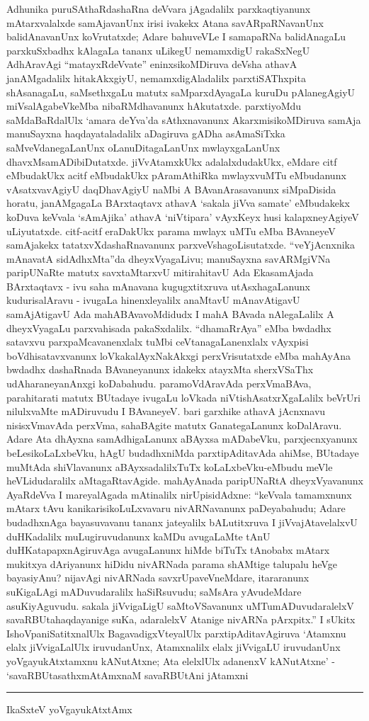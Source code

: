 Adhunika puruSAthaRdashaRna deVvara jAgadalilx parxkaqtiyanunx mAtarxvalalxde samAja\-vanUnx irisi ivakekx Atana savARpaRNavanUnx balidAnavanUnx koVrutatxde; Adare bahuveVLe I samapaRNa balidAnagaLu parxkuSxbadhx kAlagaLa tananx uLikegU nemamxdigU rakaSxNegU AdhAravAgi ``matayxRdeVvate'' eninxsikoMDiruva deVsha athavA janAMgadalilx hita\-kAkxgiyU, nemamxdigAladalilx parxtiSAThxpita shAsanagaLu, saMsethxgaLu matutx saMparxdAya\-gaLa kuruDu pAlanegAgiyU miVsalAgabeVkeMba nibaRMdhavanunx hAkutatxde. parxtiyoMdu saMdaBaRdalUlx `amara deYva'da sAthxnavanunx AkarxmisikoMDiruva samAja manuSayxna haqdayataladalilx aDagiruva gADha asAmaSiTxka saMveVdanegaLanUnx oLanuDitagaLanUnx mwlayxgaLanUnx dhavxMsamADibiDutatxde. jiVvAtamxkUkx adalalxdudakUkx, eMdare citf eMbu\-dakUkx acitf eMbudakUkx pAramAthiRka mwlayxvuMTu eMbudanunx vAsatxvavAgiyU daqDhavAgiyU naMbi A BAvanArasavanunx siMpaDisida horatu, janAMgagaLa BArxtaqtavx athavA `sakala jiVva samate' eMbudakekx koDuva keVvala `sAmAjika' athavA `niVtipara' vAyxKeyx husi kalapxneyAgiyeV uLiyutatxde. citf-acitf eraDakUkx parama mwlayx uMTu eMba BAvaneyeV samAjakekx tatatxvXdashaRnavanunx parxveVshagoLisutatxde. ``veYjAcnx\-nika mAnavatA sidAdhxMta''da dheyxVyagaLivu; manuSayxna savARMgiVNa paripUNaRte matutx savxtaMtarxvU mitirahitavU Ada EkasamAjada BArxtaqtavx - ivu saha mAnavana kugugx\-titxruva utAsxhagaLanunx kudurisalAravu - ivugaLa hinenxleyalilx anaMtavU mAna\-vAtigavU samAjAtigavU Ada mahABAvavoMdidudx I mahA BAvada nAlegaLalilx A dheyxVya\-gaLu parxvahisada pakaSxdalilx. ``dhamaRrAya'' eMba bwdadhx satavxvu parxpaMcavanenxlalx tuMbi ceVtanagaLanenxlalx vAyxpisi boVdhisatavxvanunx loVkakalAyxNakAkxgi perxVrisutatxde eMba mahA\-yAna bwdadhx dashaRnada BAvaneyanunx idakekx atayxMta sherxVSaThx udAharaneyanAnxgi koDa\-bahudu. paramoVdAravAda perxVmaBAva, parahitarati matutx BUtadaye ivu\-gaLu loVkada niVtishAsatxrXgaLalilx beVrUri nilulxvaMte mADiruvudu I BAvaneyeV. bari \hbox{garxhike} athavA jAcnxnavu nisisxVmavAda perxVma, sahaBAgite matutx GanategaLanunx koDa\-lAravu. Adare Ata dhAyxna samAdhigaLanunx aBAyxsa mADabeVku, parxjecnxyanunx beLesi\-koLaLxbeVku, hAgU budadhxniMda parxtipAditavAda ahiMse, BUtadaye muMtAda shiVla\-vanunx aBAyxsa\-dalilxTuTx koLaLxbeVku-eMbudu meVle heVLidudaralilx aMtagaRtavAgide. mahAyAnada paripUNaRtA dheyxVyavanunx AyaRdeVva I mareyalAgada mAti\-nalilx nirUpisidAdxne: ``keVvala tamamxnunx mAtarx tAvu kanikarisikoLuLxvavaru nivARNa\-vanunx paDeyabahudu; Adare budadhxnAga bayasuvavanu tananx jateyalilx bALutitxruva I jiVvajAtavelalxvU duHKadalilx muLugiruvudanunx kaMDu avugaLaMte tAnU duHKa\-tapapxnAgiruvAga avu\-gaLanunx hiMde biTuTx tAnobabx mAtarx mukitxya dAriyanunx hiDidu nivARNada parama shAMtige talupalu heVge bayasiyAnu? nijavAgi nivARNada savxrUpaveVneMdare, itararanunx suKigaLAgi mADuvudaralilx haSiRsuvudu; saMsAra yAvudeMdare asuKi\-yAguvudu. sakala jiVvigaLigU saMtoVSavanunx uMTu\-mADuvudaralelxV savaR\-BUta\-haqdayanige suKa, adaralelxV Atanige nivARNa pArxpitx.'' I sUkitx IshoVpaniSatitx\-nalUlx BagavadigxVteyalUlx parxti\-pAdita\-vAgiruva `Atamxnu elalx jiVvigaLalUlx iruvudanUnx, Atamxnalilx elalx jiVvigaLU iruvudanUnx yoVgayukAtxtamxnu kANutAtxne; Ata elelxlUlx adanenxV kANutAtxne' - `savaR\-BUtasathxmAtAmxnaM savaRBUtAni jAtamxni {\rm \rule{.03cm}{.2cm}} IkaSxteV yoVga\-yukAtxtAmx 